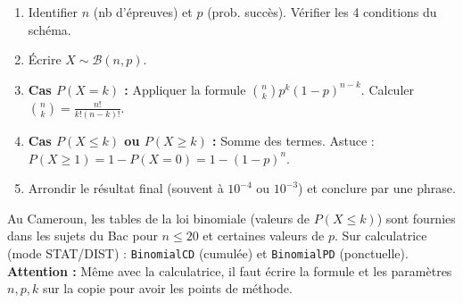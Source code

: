 \documentclass[11pt]{article}
\begin{document}
\begin{methode}[Calculer $P(X=k)$ ou $P(X \le k)$ avec la loi binomiale]
\begin{enumerate}
    \item Identifier $n$ (nb d'épreuves) et $p$ (prob. succès). Vérifier les 4 conditions du schéma.
    \item Écrire $X \sim \mathcal{B}(n,p)$.
    \item \textbf{Cas $P(X=k)$ :} Appliquer la formule $\binom{n}{k}p^k(1-p)^{n-k}$. Calculer $\binom{n}{k} = \frac{n!}{k!(n-k)!}$.
    \item \textbf{Cas $P(X \le k)$ ou $P(X \ge k)$ :} Somme des termes. Astuce : $P(X \ge 1) = 1 - P(X=0) = 1 - (1-p)^n$.
    \item Arrondir le résultat final (souvent à $10^{-4}$ ou $10^{-3}$) et conclure par une phrase.
\end{enumerate}
\end{methode}

\begin{savaistu}
Au Cameroun, les tables de la loi binomiale (valeurs de $P(X \le k)$) sont fournies dans les sujets du Bac pour $n \le 20$ et certaines valeurs de $p$. Sur calculatrice (mode STAT/DIST) : \texttt{BinomialCD} (cumulée) et \texttt{BinomialPD} (ponctuelle). \textbf{Attention :} Même avec la calculatrice, il faut écrire la formule et les paramètres $n, p, k$ sur la copie pour avoir les points de méthode.
\end{savaistu}
\end{document}
